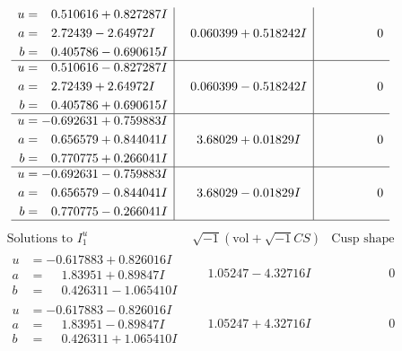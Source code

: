 \documentclass[1p]{elsarticle_modified}
\theoremstyle{definition}
\newcommand{\I}{\sqrt{-1}}
\begin{document}
$$\begin{array}{c|c|c}
\begin{aligned}
u &= \phantom{-}0.510616 + 0.827287 I \\
a &= \phantom{-}2.72439 - 2.64972 I \\
b &= \phantom{-}0.405786 - 0.690615 I\end{aligned}
 & \phantom{-}0.060399 + 0.518242 I & \phantom{-0.000000 } 0 \\ \hline\begin{aligned}
u &= \phantom{-}0.510616 - 0.827287 I \\
a &= \phantom{-}2.72439 + 2.64972 I \\
b &= \phantom{-}0.405786 + 0.690615 I\end{aligned}
 & \phantom{-}0.060399 - 0.518242 I & \phantom{-0.000000 } 0 \\ \hline\begin{aligned}
u &= -0.692631 + 0.759883 I \\
a &= \phantom{-}0.656579 + 0.844041 I \\
b &= \phantom{-}0.770775 + 0.266041 I\end{aligned}
 & \phantom{-}3.68029 + 0.01829 I & \phantom{-0.000000 } 0 \\ \hline\begin{aligned}
u &= -0.692631 - 0.759883 I \\
a &= \phantom{-}0.656579 - 0.844041 I \\
b &= \phantom{-}0.770775 - 0.266041 I\end{aligned}
 & \phantom{-}3.68029 - 0.01829 I & \phantom{-0.000000 } 0\\
 \hline 
 \end{array}$$\newpage$$\begin{array}{c|c|c}  
\text{Solutions to }I^u_{1}& \I (\text{vol} + \sqrt{-1}CS) & \text{Cusp shape}\\
 \hline 
\begin{aligned}
u &= -0.617883 + 0.826016 I \\
a &= \phantom{-}1.83951 + 0.89847 I \\
b &= \phantom{-}0.426311 - 1.065410 I\end{aligned}
 & \phantom{-}1.05247 - 4.32716 I & \phantom{-0.000000 } 0 \\ \hline\begin{aligned}
u &= -0.617883 - 0.826016 I \\
a &= \phantom{-}1.83951 - 0.89847 I \\
b &= \phantom{-}0.426311 + 1.065410 I\end{aligned}
 & \phantom{-}1.05247 + 4.32716 I & \phantom{-0.000000 } 0 \\ \hline\begin{aligned}

\end{aligned}
\end{array}$$
\end{document}
